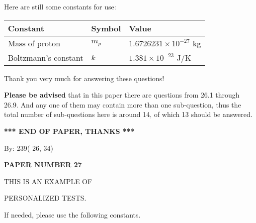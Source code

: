 \documentclass[12pt]{article}
\begin{document}
 
 
   
   
 \vspace{0.2in}
Here are still some constants for use:
 
 
\noindent\begin{tabular}{|l|l|l|}
\hline
Constant & Symbol & Value \\
\hline
 
Mass of proton &
$m_p$ &
 $ 1.6726231 \times 10^{-27} $
kg \\
\hline
 
Boltzmann's constant &
$k$ &
 $ 1.381 \times 10^{-23} $
J/K \\
\hline
 
\end{tabular}
 
Thank you very much for answering these questions!
 
{\textbf{\large{Please be advised}}} that in this paper there are questions from
26.1 through
26.9.
And any one of them may contain more than one sub-question, thus the total number
of sub-questions here is around 14, of which
13 should be answered.
 
   
   
   
   
\vspace{1.0in} 
{\textbf{\large{ *** END OF PAPER, THANKS *** }}} 
   
   
\hspace{1.0in} By: 
         239(         26,          34)
   
   
   
   
\newpage 
\setcounter{page}{ 
    27001 } 
   
   
   
   
 {\textbf{ \Large{ PAPER NUMBER          27 }}}
   
   
\vspace{0.2in}
   
   
   
   
   
   
 \vspace{0.2in}
 
 
{\Huge  THIS IS AN EXAMPLE OF}
 
{\Huge  PERSONALIZED TESTS. }
 
If needed, please use the following constants.
 
\end{document}
